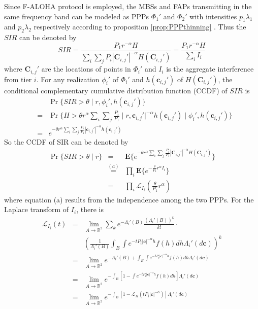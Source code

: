 \documentclass[a4paper,twocolumn]{IEEEtran}
\begin{document}
Since F-ALOHA protocol is employed, the MBSs and FAPs transmitting in the same frequency band can be modeled as PPPs $\Phi_1'$ and $\Phi_2'$ with intensities $p_1\lambda_1$ and $p_2\lambda_2$ respectively according to proposition \ref{prop:PPPthinning} . Thus the $SIR$ can be denoted by
\begin{equation}
SIR = \frac{P_1 r^{-\alpha} H}{\sum_i\sum_j P_i | \bm{C}_{i,j}' |^{-\alpha} H(\bm{C}_{i,j}')}=\frac{P_1 r^{-\alpha} H}{\sum_i I_i}
\end{equation}
where $\bm{C}_{i,j}'$ are the locations of points in $\Phi_i'$ and  $I_i$ is the aggregate interference from tier $i$. For any realization $\phi_i'$ of $\Phi_i'$ and $h(\bm{c}_{i,j}')$ of $H(\bm{C}_{i,j}')$, the conditional complementary cumulative distribution function (CCDF) of $SIR$ is
\begin{eqnarray}
&&\Pr\{SIR > \theta \mid r, \phi_i',h(\bm{c}_{i,j}') \}\nonumber\\
&=& \Pr \{ H > \theta r^{\alpha} {\sum_i\sum_j \frac{P_i}{P_1} \mid r, \bm{c}_{i,j}' |^{-\alpha} h(\bm{c}_{i,j}')} \mid \phi_i',h(\bm{c}_{i,j}') \} \nonumber\\
&=& e^{-\theta r^{\alpha} {\sum_i\sum_j \frac{P_i}{P_1} | \bm{c}_{i,j}' |^{-\alpha} h(\bm{c}_{i,j}')}}
\end{eqnarray}
So the CCDF of SIR can be denoted by
\begin{eqnarray}
\Pr\{SIR > \theta \mid r\}&=&\mathbf{E}\{ e^{-\theta r^{\alpha} {\sum_i\sum_j \frac{P_i}{P_1} | \bm{C}_{i,j}' |^{-\alpha} H(\bm{C}_{i,j}')}} \} \nonumber\\
&\stackrel{(a)}{=}&\prod_{i} \mathbf{E} \{ e^{- \frac{\theta}{P_1} r^{\alpha} I_i} \} \nonumber\\
&=&\prod_{i} \mathcal{L}_{I_i} (\frac{\theta}{P_1} r^{\alpha})
\end{eqnarray}
where equation (a) results from the independence among the two PPPs. For the Laplace transform of $I_i$, there is
\begin{eqnarray}\label{Eq:Lap_Intf}
\mathcal{L}_{I_i} (t) &=&\lim_{A \rightarrow \mathbb{R}^2} \sum_k e^{-\Lambda_i' (B)} \frac{(\Lambda_i' (B))^k}{k!}\cdot \nonumber\\
&&(\frac{1}{\Lambda_i' (B)}\int_{B}\int e^{-t P_i |\bm{c}|^{-\alpha} h}f(h) dh \Lambda_i'(d\bm{c}))^k \nonumber\\
&=&\lim_{A \rightarrow \mathbb{R}^2} e^{-\Lambda_i' (B)+\int_{B}\int e^{-t P_i |\bm{c}|^{-\alpha} h}f(h) dh \Lambda_i'(d\bm{c})}\nonumber\\
&=&\lim_{A \rightarrow \mathbb{R}^2}  e^{-\int_{B}[1-\int e^{-t P_i |\bm{c}|^{-\alpha} h}f(h) dh] \Lambda_i'(d\bm{c})}\nonumber\\
&=&\lim_{A \rightarrow \mathbb{R}^2}  e^{-\int_{B}[1-\mathcal{L}_H (t P_i |\bm{c}|^{-\alpha})] \Lambda_i'(d\bm{c})}
\end{eqnarray}
\end{document}
